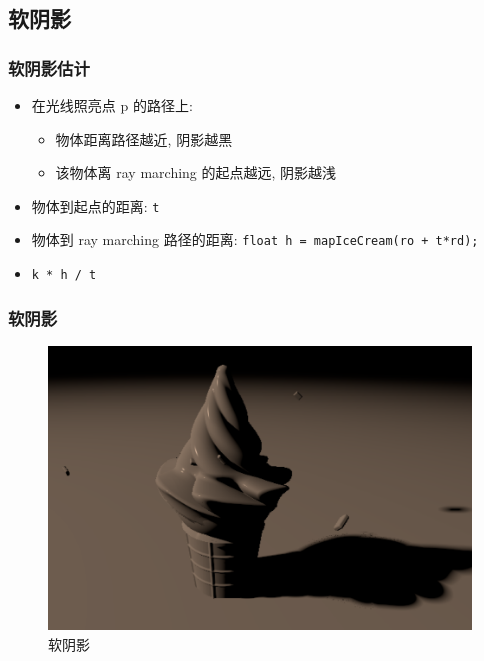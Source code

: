 \documentclass[aspectratio=169]{ctexbeamer} %
\begin{document}
\subsection{软阴影}
\begin{frame}
    \frametitle{软阴影估计}
    \begin{itemize}
        \item 在光线照亮点 p 的路径上:
        \begin{itemize}
            \item 物体距离路径越近, 阴影越黑
            \item 该物体离 ray marching 的起点越远, 阴影越浅
        \end{itemize}
        \item 物体到起点的距离: \texttt{t}
        \item 物体到 ray marching 路径的距离: \texttt{float h = mapIceCream(ro + t*rd);}
        \item \texttt{k * h / t}
    \end{itemize}
\end{frame}
\begin{frame}
    \frametitle{软阴影}
    \begin{figure}[htbp]
        \centering
        \includegraphics[height=.75\textheight]{images/pre/softshadow.pdf}
        \caption{软阴影}
        \label{fig:softshadow}
    \end{figure}
\end{frame}
\end{document}
